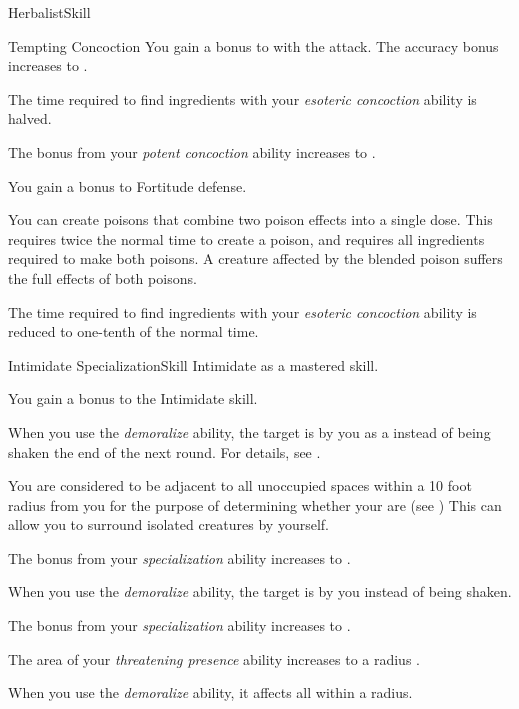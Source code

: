 \begin{feat}{Herbalist}{Skill}
\begin{attuneability}{Tempting Concoction}
            \rankline
             You gain a  bonus to  with the attack.
             The accuracy bonus increases to .
        \end{attuneability}

         The time required to find ingredients with your \textit{esoteric concoction} ability is halved.

         The bonus from your \textit{potent concoction} ability increases to .

         You gain a  bonus to Fortitude defense.

         You can create poisons that combine two poison effects into a single dose.
        This requires twice the normal time to create a poison, and requires all ingredients required to make both poisons.
        A creature affected by the blended poison suffers the full effects of both poisons.

         The time required to find ingredients with your \textit{esoteric concoction} ability is reduced to one-tenth of the normal time.
    \end{feat}

    \begin{feat}{Intimidate Specialization}{Skill}
        \featpre Intimidate as a mastered skill.

         You gain a  bonus to the Intimidate skill.

         When you use the \textit{demoralize} ability, the target is \shaken by you as a  instead of being shaken the end of the next round.
        For details, see .

         You are considered to be adjacent to all unoccupied spaces within a 10 foot radius  from you for the purpose of determining whether your  are \surrounded (see )
        This can allow you to surround isolated creatures by yourself.

         The bonus from your \textit{specialization} ability increases to .

         When you use the \textit{demoralize} ability, the target is \frightened by you instead of being shaken.

         The bonus from your \textit{specialization} ability increases to .

         The area of your \textit{threatening presence} ability increases to a \areasmall radius .

         When you use the \textit{demoralize} ability, it affects all  within a \largearea radius.
    \end{feat}


